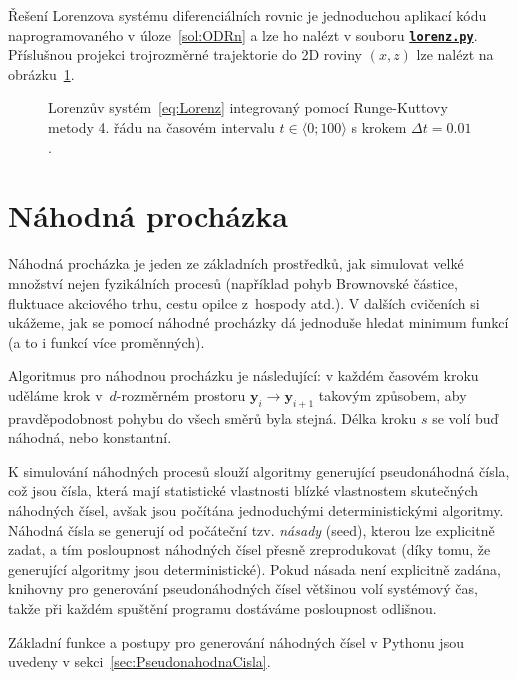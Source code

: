\documentclass[a4paper,11pt,twoside]{article}
\def\vector#1{\boldsymbol{#1}}								%
\def\ghfile#1#2{\textnormal{\textbf{\texttt{\href{https://github.com/PavelStransky/PCInPhysics2021/blob/main/#1#2}{#2}}}}}
\theoremstyle{red}
\theoremstyle{green}
\begin{document}
\begin{solution}
    Řešení Lorenzova systému diferenciálních rovnic je jednoduchou aplikací kódu naprogramovaného v úloze~\ref{sol:ODRn} a lze ho nalézt v souboru \ghfile{python/ode/}{lorenz.py}.
    Příslušnou projekci trojrozměrné trajektorie do 2D roviny $(x,z)$ lze nalézt na obrázku~\ref{fig:Lorenz}.

    \begin{figure}[!htbp]
        \centering
        \caption{
            \protect\small
                Lorenzův systém~\eqref{eq:Lorenz} integrovaný pomocí Runge-Kuttovy metody 4. řádu na časovém intervalu $t\in\langle0;100\rangle$ s krokem $\Delta t=0.01$.
            }	
        \label{fig:Lorenz}
    \end{figure}
\end{solution}


\section{Náhodná procházka}\label{sec:NahodnaProchazka}
    Náhodná procházka je jeden ze základních prostředků, jak simulovat velké množství nejen fyzikálních procesů (například pohyb Brownovské částice, fluktuace akciového trhu, cestu opilce z~hospody atd.).
    V dalších cvičeních si ukážeme, jak se pomocí náhodné procházky dá jednoduše hledat minimum funkcí (a to i funkcí více proměnných). 

    Algoritmus pro náhodnou procházku je následující: v každém časovém kroku uděláme krok v~$d$-rozměrném prostoru $\vector{y}_{i}\rightarrow\vector{y}_{i+1}$ takovým způsobem, aby pravděpodobnost pohybu do všech směrů byla stejná.
    Délka kroku $s$ se volí buď náhodná, nebo konstantní.

    K simulování náhodných procesů slouží algoritmy generující pseudonáhodná čísla, což jsou čísla, která mají statistické vlastnosti blízké vlastnostem skutečných náhodných čísel, avšak jsou počítána jednoduchými deterministickými algoritmy.
    Náhodná čísla se generují od počáteční tzv. \emph{násady} (seed), kterou lze explicitně zadat, a tím posloupnost náhodných čísel přesně zreprodukovat (díky tomu, že generující algoritmy jsou deterministické).
    Pokud násada není explicitně zadána, knihovny pro generování pseudonáhodných čísel většinou volí systémový čas, takže při každém spuštění programu dostáváme posloupnost odlišnou.

    Základní funkce a postupy pro generování náhodných čísel v Pythonu jsou uvedeny v sekci~\ref{sec:PseudonahodnaCisla}.
\end{document}
